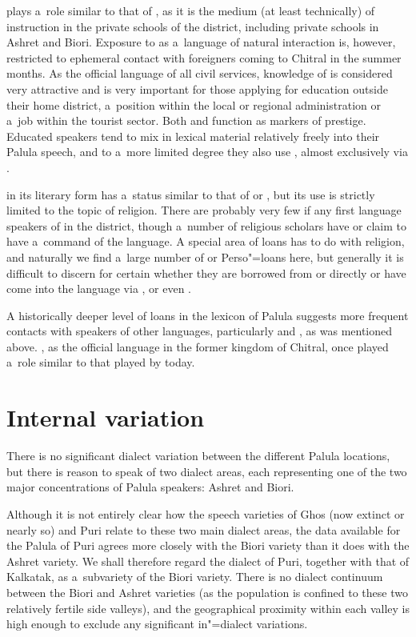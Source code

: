 \iliEnglish plays a~role similar to that of \iliUrdu, as it is the medium (at least technically) of instruction in the private schools of the district, including private schools in Ashret and Biori. Exposure to \iliEnglish as a~language of natural interaction is, however, restricted to ephemeral contact with foreigners coming to Chitral in the summer months. As the official language of all civil services, knowledge of \iliEnglish is considered very attractive and is very important for those applying for education outside their home district, a~position within the local or regional administration or a~job within the tourist sector. Both \iliUrdu and \iliEnglish function as markers of prestige. Educated speakers tend to mix in \iliUrdu lexical material relatively freely into their Palula speech, and to a~more limited degree they also use \iliEnglish, almost exclusively via \iliUrdu. 


\iliArabic in its literary form has a~status similar to that of \iliUrdu or \iliEnglish, but its use is strictly limited to the topic of religion. There are probably very few if any first language speakers of \iliArabic in the district, though a~number of religious scholars have or claim to have a~command of the language. A special area of loans has to do with religion, and naturally we find a~large number of \iliArabic or Perso"=\iliArabic loans here, but generally it is difficult to discern for certain whether they are borrowed from \iliArabic or \iliPersian directly or have come into the language via \iliPashto, \iliUrdu or even \iliKhowar.


A historically deeper level of loans in the lexicon of Palula suggests more frequent contacts with speakers of other languages, particularly \iliDameli and \iliKalasha, as was mentioned above. \iliPersian, as the official language in the former kingdom of Chitral, once played a~role similar to that played by \iliUrdu today. 


\section{Internal variation}
\label{sec:1-4}
\largerpage
There is no significant dialect variation between the different Palula locations, but there is reason to speak of two dialect areas, each representing one of the two major concentrations of Palula speakers: Ashret and Biori. 


Although it is not entirely clear how the speech varieties of Ghos (now extinct or nearly so) and Puri relate to these two main dialect areas, the data available for the Palula of Puri agrees more closely with the Biori variety than it does with the Ashret variety. We shall therefore regard the dialect of Puri, together with that of Kalkatak, as a~subvariety of the Biori variety. There is no dialect continuum between the Biori and Ashret varieties (as the population is confined to these two relatively fertile side valleys), and the geographical proximity within each valley is high enough to exclude any significant in"=dialect variations. 


